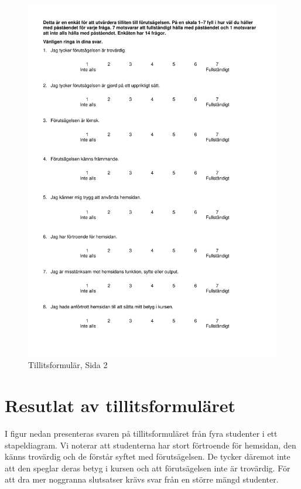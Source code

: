 \begin{figure}[htp]
    \centering
    \includegraphics[page=2,scale=0.8]{appendix/tillit_form.pdf}
    \caption*{Tillitsformulär, Sida 2}
    \label{fig:tillit_form2}
\end{figure}



\section{Resutlat av tillitsformuläret}
\label{app:resultattillit}
I figur nedan presenteras svaren på tillitsformuläret från fyra studenter i ett stapeldiagram. Vi noterar att studenterna har stort förtroende för hemsidan, den känns trovärdig och de förstår syftet med förutsägelsen. De tycker däremot inte att den speglar deras betyg i kursen och att förutsägelsen inte är trovärdig. För att dra mer noggranna slutsatser krävs svar från en större mängd studenter.


